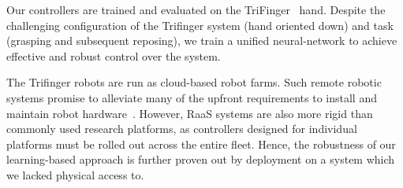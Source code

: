 \documentclass[letterpaper, 10 pt, conference]{ieeeconf}  %
\begin{document}
Our controllers are trained and evaluated on the TriFinger~\citep{trifinger-platform} hand. Despite the challenging configuration of the Trifinger system (hand oriented down) and task (grasping and subsequent reposing), we train a unified  neural-network to achieve effective and robust control over the system. 

The Trifinger robots are run as cloud-based robot farms. Such remote robotic systems promise to alleviate many of the upfront requirements to install and maintain robot hardware~\cite{kehoe2015cloudrobsurvey}. However, RaaS systems are also more rigid than commonly used research platforms, as controllers designed for individual platforms must be rolled out across the entire fleet. Hence, the robustness of our learning-based approach is further proven out by deployment on a system which we lacked physical access to.


\end{document}
